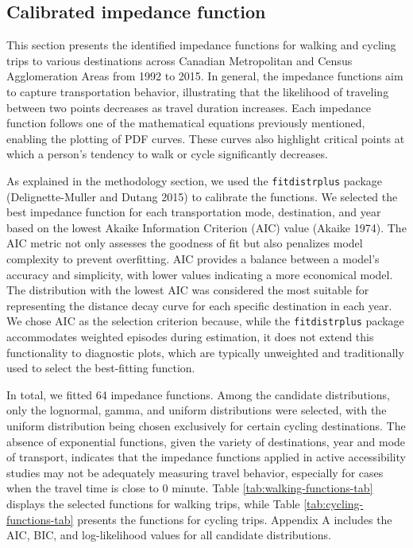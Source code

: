 \documentclass[preprint, 3p,
authoryear]{elsarticle} %
\begin{document}
\hypertarget{calibrated-impedance-function}{%
\subsection{Calibrated impedance
function}\label{calibrated-impedance-function}}

This section presents the identified impedance functions for walking and
cycling trips to various destinations across Canadian Metropolitan and
Census Agglomeration Areas from 1992 to 2015. In general, the impedance
functions aim to capture transportation behavior, illustrating that the
likelihood of traveling between two points decreases as travel duration
increases. Each impedance function follows one of the mathematical
equations previously mentioned, enabling the plotting of PDF curves.
These curves also highlight critical points at which a person's tendency
to walk or cycle significantly decreases.

As explained in the methodology section, we used the
\texttt{fitdistrplus} package (Delignette-Muller and Dutang 2015) to
calibrate the functions. We selected the best impedance function for
each transportation mode, destination, and year based on the lowest
Akaike Information Criterion (AIC) value (Akaike 1974). The AIC metric
not only assesses the goodness of fit but also penalizes model
complexity to prevent overfitting. AIC provides a balance between a
model's accuracy and simplicity, with lower values indicating a more
economical model. The distribution with the lowest AIC was considered
the most suitable for representing the distance decay curve for each
specific destination in each year. We chose AIC as the selection
criterion because, while the \texttt{fitdistrplus} package accommodates
weighted episodes during estimation, it does not extend this
functionality to diagnostic plots, which are typically unweighted and
traditionally used to select the best-fitting function.

In total, we fitted 64 impedance functions. Among the candidate
distributions, only the lognormal, gamma, and uniform distributions were
selected, with the uniform distribution being chosen exclusively for
certain cycling destinations. The absence of exponential functions,
given the variety of destinations, year and mode of transport, indicates
that the impedance functions applied in active accessibility studies may
not be adequately measuring travel behavior, especially for cases when
the travel time is close to 0 minute. Table
\ref{tab:walking-functions-tab} displays the selected functions for
walking trips, while Table \ref{tab:cycling-functions-tab} presents the
functions for cycling trips. Appendix A includes the AIC, BIC, and
log-likelihood values for all candidate distributions.
\end{document}
